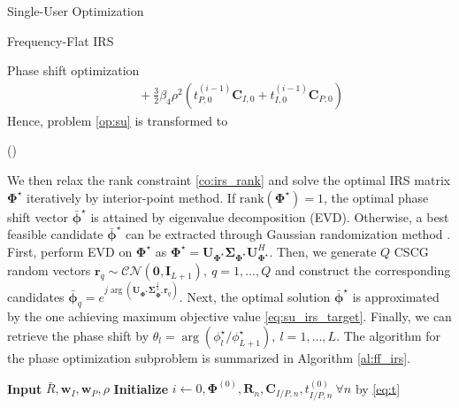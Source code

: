 \documentclass{IEEEtran}
\begin{document}
\begin{section}{Single-User Optimization}
\begin{subsection}{Frequency-Flat IRS}
\begin{subsubsection}{Phase shift optimization}
\begin{equation}
\begin{split}
					& \quad+ \frac{3}{2} \beta_4 \rho^2 (t_{P,0}^{(i-1)}\boldsymbol{C}_{I,0} + t_{I,0}^{(i-1)}\boldsymbol{C}_{P,0})
				\end{split}
			\end{equation}
			Hence, problem \ref{op:su} is transformed to
			\begin{maxi!}
				{\boldsymbol{\boldsymbol{\Phi}}}{(\boldsymbol{\Phi})}{\label{op:su_irs}}{\label{eq:su_irs_target}}
			\end{maxi!}
			We then relax the rank constraint \ref{co:irs_rank} and solve the optimal IRS matrix $\boldsymbol{\Phi}^{\star}$ iteratively by interior-point method. If $\mathrm{rank}(\boldsymbol{\Phi}^{\star})=1$, the optimal phase shift vector $\bar{\boldsymbol{\phi}}^\star$ is attained by eigenvalue decomposition (EVD). Otherwise, a best feasible candidate $\bar{\boldsymbol{\phi}}^\star$ can be extracted through Gaussian randomization method \cite{Huang2010}. First, perform EVD on $\boldsymbol{\Phi}^{\star}$ as $\boldsymbol{\Phi}^{\star}=\boldsymbol{U}_{\boldsymbol{\Phi}^{\star}}\boldsymbol{\Sigma}_{\boldsymbol{\Phi}^{\star}}\boldsymbol{U}_{\boldsymbol{\Phi}^{\star}}^H$. Then, we generate $Q$ CSCG random vectors $\boldsymbol{r}_q \sim \mathcal{CN}(\boldsymbol{0},\boldsymbol{I}_{L+1}),\ q=1,\dots,Q$ and construct the corresponding candidates $\bar{\boldsymbol{\phi}}_q=e^{j\arg\left(\boldsymbol{U}_{\boldsymbol{\Phi}^{\star}}\boldsymbol{\Sigma}_{\boldsymbol{\Phi}^{\star}}^{\frac{1}{2}}\boldsymbol{r}_q\right)}$. Next, the optimal solution $\bar{\boldsymbol{\phi}}^\star$ is approximated by the one achieving maximum objective value \ref{eq:su_irs_target}. Finally, we can retrieve the phase shift by $\theta_l=\arg(\phi_l^\star/\phi_{L+1}^\star), \ l=1,\dots,L$. The algorithm for the phase optimization subproblem is summarized in Algorithm \ref{al:ff_irs}.
			\begin{algorithm}
				\caption{FF-IRS: Phase Shift Optimization}
				\label{al:ff_irs}
				\begin{algorithmic}[1]
					\State \textbf{Input} $\bar{R},\boldsymbol{w}_I,\boldsymbol{w}_P,\rho$
					\State \textbf{Initialize} $i \leftarrow 0,\boldsymbol{\Phi}^{(0)},\boldsymbol{R}_n,\boldsymbol{C}_{I/P,n},t_{I/P,n}^{(0)}\ \forall n$ by \ref{eq:t}

\end{algorithmic}
\end{algorithm}
\end{subsubsection}
\end{subsection}
\end{section}
\end{document}
